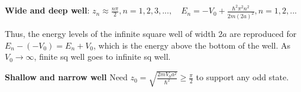 \textbf{Wide and deep well}:
$z_n \approx \frac{n \pi}{2}, n = 1, 2, 3, ..., \quad E_n = -V_0 + \frac{\hbar^2 \pi^2 n^2}{2m(2a)^2}, n = 1, 2, ...$

Thus, the energy levels of the infinite square well of width $2a$ are reproduced for $E_n - (-V_0) = E_n + V_0$, which is the energy above the bottom of the well. As $V_0 \rightarrow \infty$, finite sq well goes to infinite sq well.




\textbf{Shallow and narrow well}
Need $z_0 = \sqrt{\frac{2mV_0 a^2}{\hbar^2}} \geq \frac{\pi}{2}$ to support any odd state.


